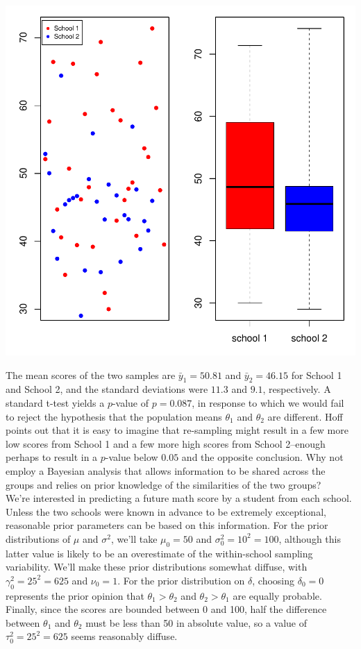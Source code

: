 \documentclass[12pt, a4paper]{article}
\begin{document}
\includegraphics{Thesis_v4-007}

\noindent The mean scores of the two samples are $\bar{y}_1 = 50.81$ and $\bar{y}_2 = 46.15$ for School 1 and School 2, and the standard deviations were $11.3$ and $9.1$, respectively.  A standard t-test yields a $p$-value of $p = 0.087$, in response to which we would fail to reject the hypothesis that the population means $\theta_1$ and $\theta_2$ are different. Hoff points out that it is easy to imagine that re-sampling might result in a few more low scores from School 1 and a few more high scores from School 2--enough perhaps to result in a $p$-value below $0.05$ and the opposite conclusion. Why not employ a Bayesian analysis that allows information to be shared across the groups and relies on prior knowledge of the similarities of the two groups?\\

\noindent We're interested in predicting a future math score by a student from each school.  Unless the two schools were known in advance to be extremely exceptional, reasonable prior parameters can be based on this information.  For the prior distributions of $\mu$ and $\sigma^2$, we'll take $\mu_0 = 50$ and $\sigma^2_0 = 10^2 = 100$, although this latter value is likely to be an overestimate of the within-school sampling variability.  We'll make these prior distributions somewhat diffuse, with $\gamma^2_0 = 25^2 = 625$ and $\nu_0 = 1$.  For the prior distribution on $\delta$, choosing $\delta_0 = 0$ represents the prior opinion that $\theta_1 > \theta_2$ and $\theta_2 > \theta_1$ are equally probable.  Finally, since the scores are bounded between 0 and 100, half the difference between $\theta_1$ and $\theta_2$ must be less than 50 in absolute value, so a value of $\tau^2_0 = 25^2 = 625$ seems reasonably diffuse.\\\\
\end{document}
